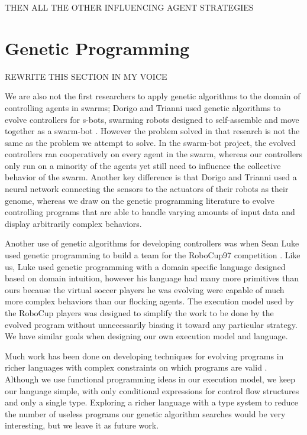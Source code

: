 THEN ALL THE OTHER INFLUENCING AGENT STRATEGIES

\section{Genetic Programming}
\label{sec:relatedgenetic}
REWRITE THIS SECTION IN MY VOICE

We are also not the first researchers to apply genetic algorithms to the domain
of controlling agents in swarms; Dorigo and Trianni used genetic algorithms to
evolve controllers for s-bots, swarming robots designed to self-assemble and
move together as a swarm-bot \cite{DorigoSwarmBot}.
However the problem solved in that research is not the same as the problem we
attempt to solve.
In the swarm-bot project, the evolved controllers ran cooperatively on every
agent in the swarm, whereas our controllers only run on a minority of the
agents yet still need to influence the collective behavior of the swarm.
Another key difference is that Dorigo and Trianni used a neural network
connecting the sensors to the actuators of their robots as their genome,
whereas we draw on the genetic programming literature to evolve controlling
programs that are able to handle varying amounts of input data and display
arbitrarily complex behaviors.

Another use of genetic algorithms for developing controllers was when Sean Luke
used genetic programming to build a team for the RoboCup97 competition
\cite{lukeRoboCup97}.
Like us, Luke used genetic programming with a domain specific language designed
based on domain intuition, however his language had many more primitives than
ours because the virtual soccer players he was evolving were capable of much
more complex behaviors than our flocking agents.
The execution model used by the RoboCup players was designed to simplify the
work to be done by the evolved program without unnecessarily biasing it toward
any particular strategy.
We have similar goals when designing our own execution model and language.

Much work has been done on developing techniques for evolving programs in
richer languages with complex constraints on which programs are valid
\cite{BriggsGP}.
Although we use functional programming ideas in our execution model, we keep
our language simple, with only conditional expressions for control flow
structures and only a single type.
Exploring a richer language with a type system to reduce the number of useless
programs our genetic algorithm searches would be very interesting, but we leave
it as future work.

